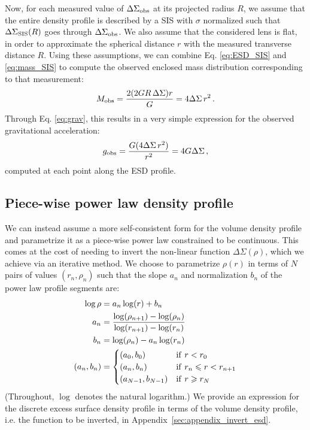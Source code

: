 \documentclass[usenatbib]{mnras}
\newcommand{\un}[1]{_{\rm #1}}
\begin{document}
Now, for each measured value of $\Delta\Sigma\un{obs}$ at its projected radius $R$, we assume that the entire density profile is described by a SIS with $\sigma$ normalized such that $\Delta\Sigma\un{SIS}(R)$ goes through $\Delta\Sigma\un{obs}$. We also assume that the considered lens is flat, in order to approximate the spherical distance $r$ with the measured transverse distance $R$. Using these assumptions, we can combine Eq. \ref{eq:ESD_SIS} and \ref{eq:mass_SIS} to compute the observed enclosed mass distribution corresponding to that measurement:
\begin{equation}
	M\un{obs} = \frac{2 (2 G R \, \Delta\Sigma) r}{G} = 4 \Delta\Sigma \, r^2 \, .
\end{equation}
Through Eq. \ref{eq:grav}, this results in a very simple expression for the observed gravitational acceleration:
\begin{equation}
g\un{obs} = \frac{G (4 \Delta\Sigma \, r^2)}{r^2} = 4 G \Delta\Sigma \, ,
\end{equation}
computed at each point along the ESD profile.

\subsection{Piece-wise power law density profile}
\label{sec:piece-wise_powerlaw}

We can instead assume a more self-consistent form for the volume density profile and parametrize it as a piece-wise power law constrained to be continuous. This comes at the cost of needing to invert the non-linear function $\Delta\Sigma(\rho)$, which we achieve via an iterative method. We choose to parametrize $\rho(r)$ in terms of $N$ pairs of values $(r_n,\rho_n)$ such that the slope $a_n$ and normalization $b_n$ of the power law profile segments are:
\begin{align}
\log\rho &= a_n \log(r) + b_n \\
a_n &= \frac{\log(\rho_{n+1})-\log(\rho_n)}{\log(r_{n+1})-\log(r_n)}\\
b_n &= \log(\rho_n) - a_n\log(r_n)\\
(a_n, b_n) &=
\begin{cases}
(a_0, b_0) & {\rm if}\ r < r_0\\
(a_n, b_n) & {\rm if}\ r_n \leq r < r_{n+1}\\
(a_{N-1}, b_{N-1}) & {\rm if}\ r \geq r_N
\end{cases}
\label{eq:rho_piecewise_powerlaw}\end{align}
(Throughout, $\log$ denotes the natural logarithm.) We provide an expression for the discrete excess surface density profile in terms of the volume density profile, i.e. the function to be inverted, in Appendix~\ref{sec:appendix_invert_esd}.
\end{document}
